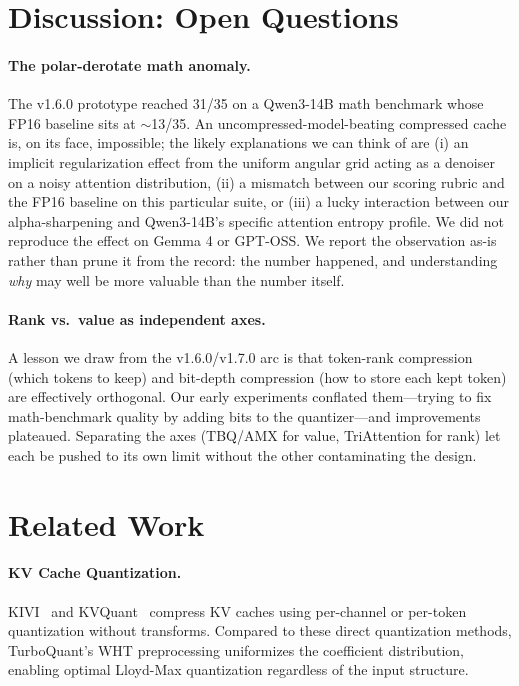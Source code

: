 \documentclass[10pt,twocolumn]{article}
\begin{document}
\section{Discussion: Open Questions}
\label{sec:discussion}

\paragraph{The polar-derotate math anomaly.} The v1.6.0 prototype reached 31/35 on a Qwen3-14B math benchmark whose FP16 baseline sits at $\sim$13/35. An uncompressed-model-beating compressed cache is, on its face, impossible; the likely explanations we can think of are (i) an implicit regularization effect from the uniform angular grid acting as a denoiser on a noisy attention distribution, (ii) a mismatch between our scoring rubric and the FP16 baseline on this particular suite, or (iii) a lucky interaction between our alpha-sharpening and Qwen3-14B's specific attention entropy profile. We did not reproduce the effect on Gemma 4 or GPT-OSS. We report the observation as-is rather than prune it from the record: the number happened, and understanding \emph{why} may well be more valuable than the number itself.

\paragraph{Rank vs.\ value as independent axes.} A lesson we draw from the v1.6.0/v1.7.0 arc is that token-rank compression (which tokens to keep) and bit-depth compression (how to store each kept token) are effectively orthogonal. Our early experiments conflated them---trying to fix math-benchmark quality by adding bits to the quantizer---and improvements plateaued. Separating the axes (TBQ/AMX for value, TriAttention for rank) let each be pushed to its own limit without the other contaminating the design.

\section{Related Work}
\label{sec:related}

\paragraph{KV Cache Quantization.} KIVI~\cite{kivi2024} and KVQuant~\cite{kvquant2024} compress KV caches using per-channel or per-token quantization without transforms. Compared to these direct quantization methods, TurboQuant's WHT preprocessing uniformizes the coefficient distribution, enabling optimal Lloyd-Max quantization regardless of the input structure.
\end{document}
